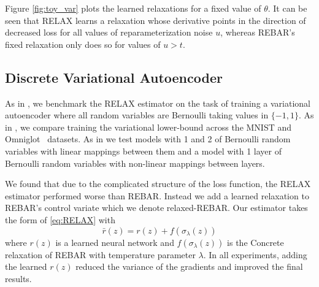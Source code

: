 \documentclass{article}
\newcommand{\relaxed}{r}
\begin{document}
Figure \ref{fig:toy_var} plots the learned relaxations for a fixed value of $\theta$.
It can be seen that RELAX learns a relaxation whose derivative points in the direction of decreased loss for all values of reparameterization noise $u$, whereas REBAR's fixed relaxation only does so for values of $u > t$.


\subsection{Discrete Variational Autoencoder}
As in \citep{tucker2017rebar}, we benchmark the RELAX estimator on the task of training a variational autoencoder \citep{kingma2013autoencoding, rezende2014stochastic} where all random variables are Bernoulli taking values in $\{-1, 1\}$.
As in \cite{tucker2017rebar}, we compare training the variational lower-bound across the MNIST and Omniglot~\citep{lake2015human} datasets.
As in \cite{tucker2017rebar} we test models with 1 and 2 of Bernoulli random variables with linear mappings between them and a model with 1 layer of Bernoulli random variables with non-linear mappings between layers.

We found that due to the complicated structure of the loss function, the RELAX estimator performed worse than REBAR. Instead we add a learned relaxation to REBAR's control variate which we denote relaxed-REBAR.
Our estimator takes the form of \eqref{eq:RELAX} with $$\bar \relaxed(z) = \relaxed(z) + f(\sigma_\lambda(z))$$ where $\relaxed(z)$ is a learned neural network and $f(\sigma_\lambda(z))$ is the Concrete relaxation of REBAR with temperature parameter $\lambda$.
In all experiments, adding the learned $\relaxed(z)$ reduced the variance of the gradients and improved the final results. 
\end{document}
